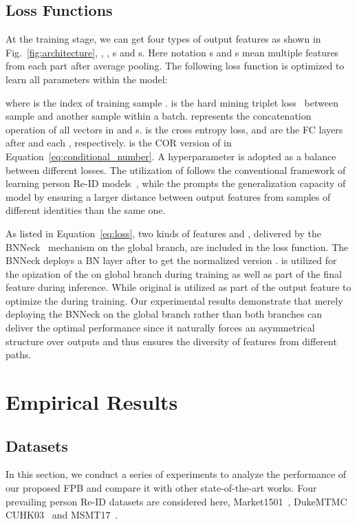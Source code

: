 \documentclass[journal]{IEEEtran}
\begin{document}
\subsection{Loss Functions}
\label{sec:loss}
At the training stage, we can get four types of output features as shown in Fig.~\ref{fig:architecture}, , , s and s.
Here notation s and s mean multiple features from each part after average pooling.
The following loss function is optimized to learn all parameters within the model:

where  is the index of training sample .
 is the hard mining triplet loss~\cite{hermans2017defense} between sample  and another sample  within a batch.
 represents the concatenation operation of all vectors in  and s.
 is the cross entropy loss,  and  are the FC layers after  and each , respectively.
 is the COR version of  in Equation~\ref{eq:conditional_number}. 
A hyperparameter  is adopted as a balance between different losses.
The utilization of  follows the conventional framework of learning person Re-ID models~\cite{zheng2016person,luo2019bag}, while the  prompts the generalization capacity of model by ensuring a larger distance between output features  from samples of different identities than the same one.

As listed in Equation~\ref{eq:loss}, two kinds of features  and , delivered by the BNNeck~\cite{luo2019bag} mechanism on the global branch, are included in the loss function.
The BNNeck deploys a BN layer after  to get the normalized version .
 is utilized for the opization of the  on global branch during training as well as part of the final feature during inference.
While original  is utilized as part of the output feature to optimize the  during training.
Our experimental results demonstrate that merely deploying the BNNeck on the global branch rather than both branches can deliver the optimal performance since it naturally forces an asymmetrical structure over outputs and thus ensures the diversity of features from different paths.


\section{Empirical Results}
\subsection{Datasets}
In this section, we conduct a series of experiments to analyze the performance of our proposed FPB and compare it with other state-of-the-art works.
Four prevailing person Re-ID datasets are considered here, Market1501~\cite{zheng2015scalable}, DukeMTMC~\cite{Ristani2016Performance} CUHK03~\cite{Li2014DeepReID} and MSMT17~\cite{8578114}.
\end{document}
